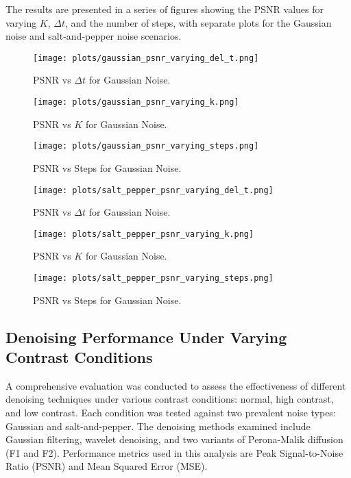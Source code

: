 \documentclass{article}
\begin{document}
The results are presented in a series of figures showing the PSNR values for varying \( K \), \( \Delta t \), and the number of steps, with separate plots for the Gaussian noise and salt-and-pepper noise scenarios.

\begin{figure}[H]
    \centering
    \texttt{[image: plots/gaussian\_psnr\_varying\_del\_t.png]}
    \caption{PSNR vs \( \Delta t \) for Gaussian Noise.}
    \label{fig:psnr_sensitivity_1}
\end{figure}

\begin{figure}[H]
    \centering
    \texttt{[image: plots/gaussian\_psnr\_varying\_k.png]}
    \caption{PSNR vs \( K \) for Gaussian Noise.}
    \label{fig:psnr_sensitivity_2}
\end{figure}

\begin{figure}[H]
    \centering
    \texttt{[image: plots/gaussian\_psnr\_varying\_steps.png]}
    \caption{PSNR vs Steps for Gaussian Noise.}
    \label{fig:psnr_sensitivity_3}
\end{figure}

\begin{figure}[H]
    \centering
    \texttt{[image: plots/salt\_pepper\_psnr\_varying\_del\_t.png]}
    \caption{PSNR vs \( \Delta t \) for Gaussian Noise.}
    \label{fig:psnr_sensitivity_4}
\end{figure}

\begin{figure}[H]
    \centering
    \texttt{[image: plots/salt\_pepper\_psnr\_varying\_k.png]}
    \caption{PSNR vs \( K \) for Gaussian Noise.}
    \label{fig:psnr_sensitivity_5}
\end{figure}

\begin{figure}[H]
    \centering
    \texttt{[image: plots/salt\_pepper\_psnr\_varying\_steps.png]}
    \caption{PSNR vs Steps for Gaussian Noise.}
    \label{fig:psnr_sensitivity_6}
\end{figure}

\subsection{Denoising Performance Under Varying Contrast Conditions}
A comprehensive evaluation was conducted to assess the effectiveness of different denoising techniques under various contrast conditions: normal, high contrast, and low contrast. Each condition was tested against two prevalent noise types: Gaussian and salt-and-pepper. The denoising methods examined include Gaussian filtering, wavelet denoising, and two variants of Perona-Malik diffusion (F1 and F2). Performance metrics used in this analysis are Peak Signal-to-Noise Ratio (PSNR) and Mean Squared Error (MSE).
\end{document}
